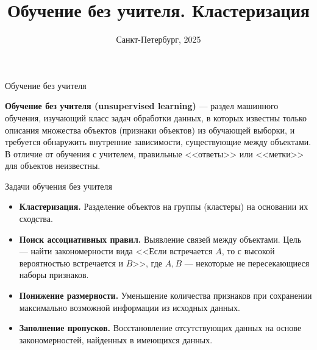 \documentclass[unicode, notheorems, handout]{beamer}
\title[Обучение без учителя. Кластеризация]{Обучение без учителя. Кластеризация}
\institute[Санкт-Петербургский Государственный Университет]{%
	\small
	Санкт-Петербургский государственный университет\\
	Кафедра статистического моделирования\\
    Семинар <<Статистическое и машинное обучение>>
}
\date[Октябрь 2025]{Санкт-Петербург, 2025}
\begin{document}
\begin{frame}
	\titlepage
\end{frame}

\begin{frame}{Обучение без учителя}

\textbf{Обучение без учителя (unsupervised learning)} --- раздел машинного обучения, изучающий класс задач обработки данных, в которых известны только описания множества объектов (признаки объектов) из обучающей выборки, и требуется обнаружить внутренние зависимости, существующие между объектами. В отличие от обучения с учителем, правильные <<ответы>> или <<метки>> для объектов неизвестны.

\end{frame}

\begin{frame}{Задачи обучения без учителя}


    \begin{itemize}
        \item \textbf{Кластеризация.}  Разделение объектов на группы (кластеры) на основании их сходства. 
        \vspace{1ex}

        
        \item \textbf{Поиск ассоциативных правил.} Выявление связей между объектами.  Цель --- найти закономерности вида <<Если встречается $A$, то с высокой вероятностью встречается и $B$>>, где $A,B$ --- некоторые не пересекающиеся наборы признаков.
        \vspace{1ex}

        
        \item \textbf{Понижение размерности.} Уменьшение количества признаков при сохранении максимально возможной информации из исходных данных.
        \vspace{1ex}
        
        \item \textbf{Заполнение пропусков.} Восстановление отсутствующих данных на основе закономерностей, найденных в имеющихся данных.
    \end{itemize}
\end{frame}
\end{document}
